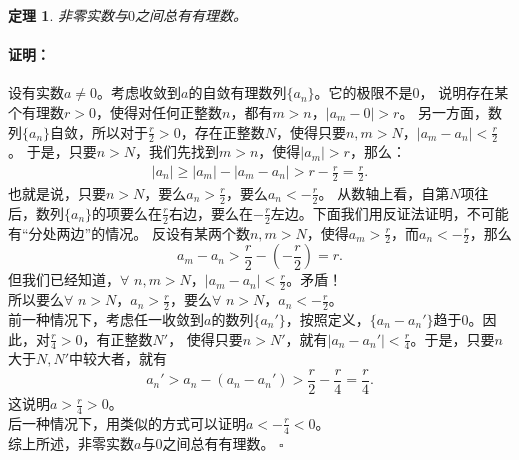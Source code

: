 \documentclass[12pt,UTF8]{ctexbook}
\newtheorem{tm}{定理}[section]
\newenvironment{proof2}{\paragraph{\textbf{证明：}}}{\hfill$\square$}
\begin{document}
\begin{appendix}
\begin{tm}\label{tm:a-1-18}
    非零实数与$0$之间总有有理数。
\end{tm}
\begin{proof2}
    设有实数$a\neq 0$。考虑收敛到$a$的自敛有理数列$\{a_n\}$。它的极限不是$0$，
    说明存在某个有理数$r>0$，使得对任何正整数$n$，都有$m>n$，$|a_m - 0| > r$。
    另一方面，数列$\{a_n\}$自敛，所以对于$\frac{r}{2} > 0$，存在正整数$N$，使得只要$n,m>N$，$|a_m - a_n| < \frac{r}{2}$。
    于是，只要$n>N$，我们先找到$m>n$，使得$|a_m| > r$，那么：
    \begin{align}
        |a_n| \geqslant |a_m| - |a_m - a_n| > r - \frac{r}{2} = \frac{r}{2}.
    \end{align}
    也就是说，只要$n>N$，要么$a_n > \frac{r}{2}$，要么$a_n < -\frac{r}{2}$。
    从数轴上看，自第$N$项往后，数列$\{a_n\}$的项要么在$\frac{r}{2}$右边，要么在$-\frac{r}{2}$左边。下面我们用反证法证明，不可能有“分处两边”的情况。
    反设有某两个数$n,m>N$，使得$a_m > \frac{r}{2}$，而$a_n < -\frac{r}{2}$，那么
    $$a_m - a_n > \frac{r}{2} - (-\frac{r}{2}) = r.$$
    但我们已经知道，$\forall \,\,n,m>N$，$|a_m - a_n| < \frac{r}{2}$。矛盾！\\
    所以要么$\forall\,\, n>N$，$a_n > \frac{r}{2}$，要么$\forall\,\, n>N$，$a_n < -\frac{r}{2}$。\\
    前一种情况下，考虑任一收敛到$a$的数列$\{a_n'\}$，按照定义，$\{a_n - a_n'\}$趋于$0$。因此，对$ \frac{r}{4} > 0$，有正整数$N'$，
    使得只要$n>N'$，就有$|a_n - a_n'| < \frac{r}{4}$。于是，只要$n$大于$N,N'$中较大者，就有
    $$ a_n' > a_n - (a_n - a_n') > \frac{r}{2} - \frac{r}{4} = \frac{r}{4}.$$
    这说明$a > \frac{r}{4} > 0$。\\
    后一种情况下，用类似的方式可以证明$a < -\frac{r}{4} < 0$。\\
    综上所述，非零实数$a$与$0$之间总有有理数。
\end{proof2}


\end{appendix}
\end{document}
